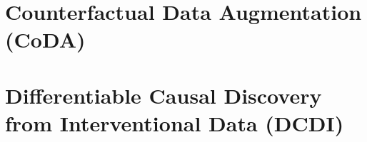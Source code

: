 \documentclass[../main.tex]{subfiles}
\begin{document}
\section{Counterfactual Data Augmentation (CoDA)}


\section{Differentiable Causal Discovery from Interventional Data (DCDI)}

\end{document}
